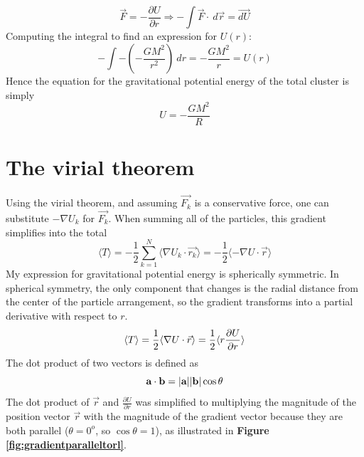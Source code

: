 \documentclass[12pt]{article}
\begin{document}
$$
    \vec{F} = -\frac{\partial U}{\partial r} \Rightarrow -\int \vec{F} \cdot \: d\vec{r} = \vec{dU}
$$
Computing the integral to find an expression for $U(r)$:
\begin{equation}\label{eq:potentialenergy}
    -\int - (-\frac{GM^2}{r^2})\: dr = - \frac{GM^2}{r} = U(r)
\end{equation}
Hence the equation for the gravitational potential energy of the total cluster is simply
$$ U = -\frac{GM^2}{R}$$

\section{The virial theorem}
Using the virial theorem, and assuming $\vec{F_k}$ is a  conservative force, one can substitute $-\nabla U_k$ for $\vec{F_k}$. When summing all of the particles, this gradient simplifies into the total 
$$\langle T \rangle = -\frac{1}{2}  \sum_{k=1}^{N} \langle \nabla U_k \cdot \vec{r_k} \rangle = -\frac{1}{2} 
 \langle -\nabla U \cdot \vec{r} \rangle $$ 
My expression for gravitational potential energy is spherically symmetric. In spherical symmetry, the only component that changes is the radial distance from the center of the particle arrangement, so the gradient transforms into a partial derivative with respect to $r$.
$$
  \langle T \rangle = \frac{1}{2} \langle \nabla U \cdot \vec{r} \rangle  \\
  = \frac{1}{2} \langle r\frac{\partial{U}}{\partial{r}} \rangle
$$
The dot product of two vectors is defined as
\begin{equation} \label{eq: dotproduct}
    \textbf{a} \cdot \textbf{b} = \abs{\textbf{a}} \abs{\textbf{b}} \cos{\theta}
\end{equation}
The dot product of $\vec{r}$ and $\frac{\partial U}{\partial r}$ was simplified to multiplying the magnitude of the position vector $\vec{r}$ with the magnitude of the gradient vector because they are both parallel ($\theta = 0^o$, so $\cos{\theta} = 1$), as illustrated in \textbf{Figure \ref{fig:gradientparalleltorl}}.
\end{document}
